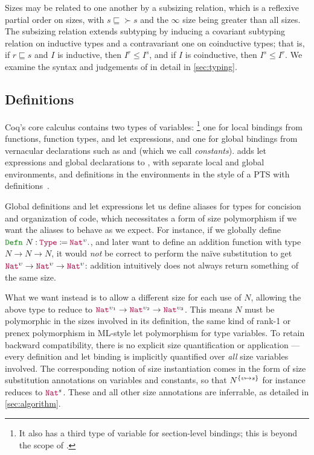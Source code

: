Sizes may be related to one another by a subsizing relation, which is a reflexive partial order on sizes,
with $s \sqsubseteq \succ{s}$ and the $\infty$ size being greater than all sizes.
The subsizing relation extends subtyping by inducing a covariant subtyping relation on inductive types and a contravariant one on coinductive types; that is,
if $r \sqsubseteq s$ and $I$ is inductive, then $I^r \leq I^s$,
and if $I$ is coinductive, then $I^s \leq I^r$.
We examine the syntax and judgements of \lang in detail in \autoref{sec:typing}.

\subsection{Definitions}

Coq's core calculus contains two types of variables:%
\footnote{It also has a third type of variable for section-level bindings;
this is beyond the scope of \lang.}
one for local bindings from functions, function types, and let expressions,
and one for global bindings from vernacular declarations such as  and  (which we call \textit{constants}).
\lang adds let expressions and global declarations to \CIChatminus,
with separate local and global environments,
and definitions in the environments in the style of a PTS with definitions~\citep[233--241]{pts}.

Global definitions and let expressions let us define aliases for types for concision and organization of code,
which necessitates a form of size polymorphism if we want the aliases to behave as we expect.
For instance, if we globally define $\Defn{N}{\Type{}}{\Nat^\upsilon}$,
and later want to define an addition function with type $N \rightarrow N \rightarrow N$,
it would \emph{not} be correct to perform the na\"ive substitution to get $\Nat^\upsilon \rightarrow \Nat^\upsilon \rightarrow \Nat^\upsilon$:
addition intuitively does not always return something of the same size.

What we want instead is to allow a different size for each use of $N$,
allowing the above type to reduce to $\Nat^{\upsilon_1} \rightarrow \Nat^{\upsilon_2} \rightarrow \Nat^{\upsilon_3}$.
This means $N$ must be polymorphic in the sizes involved in its definition,
the same kind of rank-1 or prenex polymorphism in ML-style let polymorphism for type variables.
To retain backward compatibility, there is no explicit size quantification or application ---
every definition and let binding is implicitly quantified over \emph{all} size variables involved.
The corresponding notion of size instantiation comes in the form of size substitution annotations on variables and constants, so that $N^{\{\upsilon \mapsto s\}}$ for instance reduces to $\Nat^s$.
These and all other size annotations are inferrable, as detailed in \autoref{sec:algorithm}.

